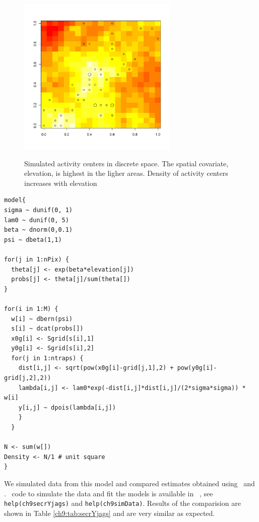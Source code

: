 \begin{figure}
\centering
\includegraphics[width=3in,height=3in]{figs/discrete}
\label{ch9:fig:discrete}
\caption{Simulated activity centers in discrete space. The spatial
  covariate, elevation, is highest in the ligher areas. Density of
  activity centers increases with elevation}
\end{figure}





\begin{verbatim}
model{
sigma ~ dunif(0, 1)
lam0 ~ dunif(0, 5)
beta ~ dnorm(0,0.1)
psi ~ dbeta(1,1)

for(j in 1:nPix) {
  theta[j] <- exp(beta*elevation[j])
  probs[j] <- theta[j]/sum(theta[])
}

for(i in 1:M) {
  w[i] ~ dbern(psi)
  s[i] ~ dcat(probs[])
  x0g[i] <- Sgrid[s[i],1]
  y0g[i] <- Sgrid[s[i],2]
  for(j in 1:ntraps) {
    dist[i,j] <- sqrt(pow(x0g[i]-grid[j,1],2) + pow(y0g[i]-grid[j,2],2))
    lambda[i,j] <- lam0*exp(-dist[i,j]*dist[i,j]/(2*sigma*sigma)) * w[i]
    y[i,j] ~ dpois(lambda[i,j])
    }
  }

N <- sum(w[])
Density <- N/1 # unit square
}
\end{verbatim}

We simulated data from this model and compared estimates obtained
using \jags~and \secr. \R~code to
simulate the data and fit the models is available in \scrbook~, see
\verb#help(ch9secrYjags)# and \verb#help(ch9simData)#. Results of the
comparision are shown in Table \ref{ch9:tab:secrYjags} and are
very similar as expected.


